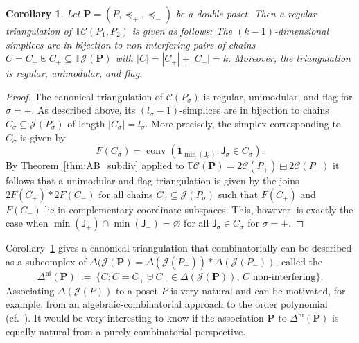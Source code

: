 \documentclass[11pt]{amsart}
\newtheorem{cor}[thm]{Corollary}
\theoremstyle{definition}
\begin{document}
\begin{cor}\label{cor:TC_triang}
    Let ${\mathbf{P}} = ({P},\preceq_+,\preceq_-)$ be a double poset. Then a regular
    triangulation of ${{\mathbb{T}}{\mathcal{C}({{{{P}_1,{P}_2}}})}}$ is given as follows: The
    $(k-1)$-dimensional simplices are in bijection to non-interfering pairs of
    chains $C = C_+ \uplus C_+ \subseteq {{\mathbb{T}}{{\mathcal{J}}({{\mathbf{P}}})}}$ with $|C| = |C_+| +
    |C_-| = k$. Moreover, the triangulation is regular, unimodular, and flag.
\end{cor}
\begin{proof}
    The canonical triangulation of ${\mathcal{C}({{{P}_\sigma}})}$ is regular, unimodular,
    and flag for $\sigma=\pm$. As described above, its
    $(l_\sigma-1)$-simplices are in bijection to chains $C_\sigma \subseteq
    {{\mathcal{J}}({{P}_\sigma})}$ of length $|C_\sigma| = l_\sigma$. More
    precisely, the simplex corresponding to $C_\sigma$ is given by
    \[
        F(C_\sigma) = \operatorname{conv}( {\mathbf{1}}_{\min({\mathsf{J}}_\sigma)} : {\mathsf{J}}_\sigma \in
        C_\sigma ).
    \]
    By Theorem~\ref{thm:AB_subdiv} applied to ${{\mathbb{T}}{\mathcal{C}({{{\mathbf{P}}}})}} =
    {{{2{\mathcal{C}({{{P}_+}})}} \boxminus {2{\mathcal{C}({{{P}_-}})}}}}$ it follows that a unimodular and
    flag triangulation is given by the joins $2F(C_+) * 2F(C_-)$ for all
    chains $C_\sigma \subseteq {{\mathcal{J}}({{P}_\sigma})}$ such that $F(C_+)$ and
    $F(C_-)$ lie in complementary coordinate subspaces. This, however, is
    exactly the case when $\min({\mathsf{J}}_+) \cap \min({\mathsf{J}}_-) = {\varnothing}$
    for all ${\mathsf{J}}_\sigma \in C_\sigma$ for $\sigma=\pm$.
\end{proof}

Corollary~\ref{cor:TC_triang} gives a canonical triangulation that
combinatorially can be described as a subcomplex of $\Delta({{\mathcal{J}}({\mathbf{P}})} =
\Delta({{\mathcal{J}}({{P}_+})}) * \Delta({{\mathcal{J}}({{P}_-})})$, called the {\textbf{\color{black}{non-interfering
complex}}}
\[
    {\Delta^\mathrm{ni}({\mathbf{P}})} \ := \ \{ C : C = C_+ \uplus C_- \in
    \Delta({{\mathcal{J}}({\mathbf{P}})}) ,\, C \text{ non-interfering} \}.
\]
Associating $\Delta({{\mathcal{J}}({P})})$ to a poset ${P}$ is very natural and can be
motivated, for example, from an algebraic-combinatorial approach to the order
polynomial (cf.~\cite{crt}). It would be very interesting to know if the
association ${\mathbf{P}}$ to ${\Delta^\mathrm{ni}({\mathbf{P}})}$ is equally natural from a purely
combinatorial perspective.
\end{document}
